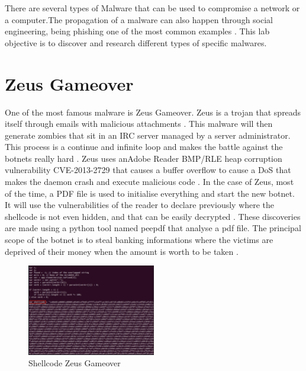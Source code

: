 There are several types of Malware that can be used to compromise a network or
a computer.The propagation of a malware can also happen through social
engineering, being phishing one of the most common examples \citep{greenbergSandwormNewEra2019}.
This lab objective is to discover and research different types of specific
malwares.

\section{Zeus Gameover}
\label{s:Zeus-Gameover}
One of the most famous malware is Zeus Gameover. Zeus is a trojan that spreads
itself through emails with malicious attachments \citep{wikipediaGameoverZeuS2021}.
This malware will then generate zombies that sit in an IRC server managed by a
server administrator. This process is a continue and infinite loop and makes the
battle against the botnets really hard \citep{firatInevitableBattleBotnets2020}.
Zeus uses anAdobe Reader BMP/RLE heap corruption vulnerability CVE-2013-2729 that
causes a buffer overflow to cause a DoS that makes the daemon crash and execute
malicious code \citep{ismailEffectsFeatureSelection2021}.
In the case of Zeus, most of the time, a PDF file is used to initialise
everything and start the new botnet. It will use the vulnerabilities of the
reader to declare previously where the shellcode is not even hidden, and that
can be easily decrypted \citep{eternalSpammedCVE20132729PDF2013}. These
discoveries are made using a python tool named peepdf that analyse a pdf file.
The principal scope of the botnet is to steal banking informations where the
victims are deprived of their money when the amount is worth to be taken \citep{
knowbe4GameoverZeusGOZ2020}.

\begin{figure}[ht]
  \centering
  \includegraphics[width=0.5\textwidth]{figures/shellcode-zeus}
  \caption{Shellcode Zeus Gameover}
  \label{f:shellcode-zeus}
\end{figure}

